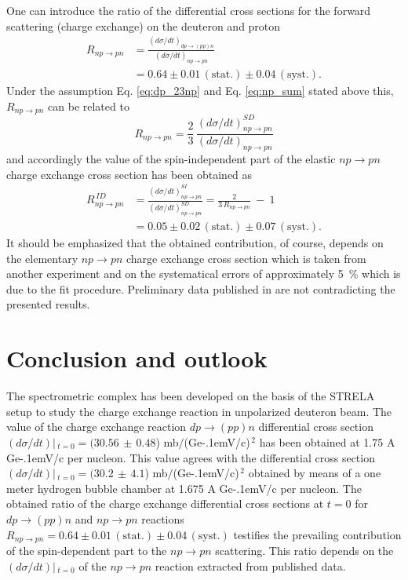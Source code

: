\documentclass[twocolumn,epjc3]{svjour3}
\newcommand{\np}     {\ensuremath{np \rightarrow pn}\xspace}
\newcommand{\dpchex} {\ensuremath{dp \rightarrow (pp)n}\xspace}
\newcommand{\GeVc}   {Ge\kern-.1emV/c\xspace}
\begin{document}
One can introduce the ratio of the differential cross sections for the forward
scattering (charge exchange) on the deuteron and proton
\begin{equation}
  \begin{split}
    R_{\np} &= \frac{(d\sigma/dt)_{\dpchex}}{(d\sigma/dt)_{\np}} \\
    &= 0.64 \pm 0.01\,\mathrm{(stat.)} \pm 0.04\,\mathrm{(syst.)}.
  \end{split}
\end{equation}
Under the assumption Eq. \eqref{eq:dp_23np} and Eq. \eqref{eq:np_sum} stated
above this, $R_{\np}$ can be related to
\begin{equation}
  R_{\np} = \frac{2}{3}\,\frac{(d\sigma/dt)^{SD}_{\np}}{(d\sigma/dt)_{\np}}
\end{equation}
and accordingly the value of the spin-independent part of the elastic \np charge
exchange cross section has been obtained as
\begin{equation}
  \begin{split}
    R^{\,ID}_{\np} &= \frac{(d\sigma/dt)^{SI}_{\np}}{(d\sigma/dt)^{SD}_{\np}}
    = \frac{2}{3\,R_{\np}} \ - \ 1 \\
    &= 0.05 \pm 0.02\,\mathrm{(stat.)} \pm 0.07\,\mathrm{(syst.)}.
  \end{split}
\end{equation}
It should be emphasized that the obtained contribution, of course, depends on
the elementary \np charge exchange cross section which is taken from another
experiment and on the systematical errors of approximately 5~\% which is due to
the fit procedure. Preliminary data published in \cite{bas14,bas16} are not
contradicting the presented results.

\section{Conclusion and outlook}
The spectrometric complex has been developed on the basis of the STRELA setup to
study the charge exchange reaction in unpolarized deuteron beam. The value of
the charge exchange reaction \dpchex differential cross section
$(d\sigma/dt)|\,_{t=0}=(30.56\,\pm\,0.48$) mb$/$(\GeVc)$^{\,2}$ has been
obtained at 1.75 A \GeVc per nucleon. This value agrees with the differential
cross section $(d\sigma/dt)|\,_{t=0}=(30.2\,\pm\,4.1$) mb$/$(\GeVc)$^{\,2}$
obtained by means of a one meter hydrogen bubble chamber at 1.675 A \GeVc per
nucleon. The obtained ratio of the charge exchange differential cross sections
at $t=0$ for \dpchex and \np reactions
$R_{\np} = 0.64 \pm 0.01\,\mathrm{(stat.)} \pm 0.04\,\mathrm{(syst.)}$ testifies
the prevailing contribution of the spin-dependent part to the \np scattering.
This ratio depends on the $(d\sigma/dt)|\,_{t=0}$ of the \np reaction extracted
from published data.
\end{document}
